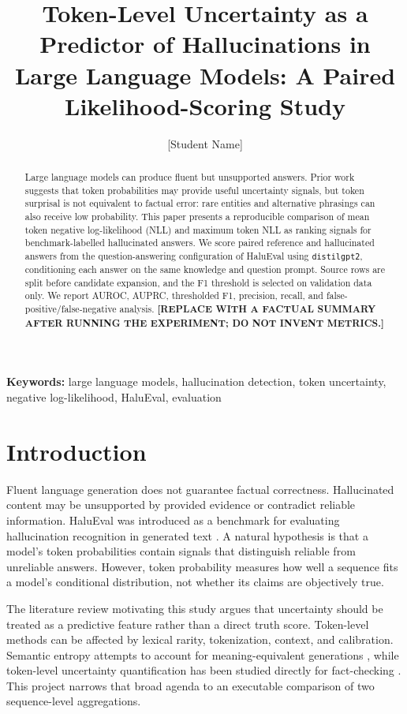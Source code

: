 \documentclass[10pt]{article}
\title{Token-Level Uncertainty as a Predictor of Hallucinations in Large Language Models: A Paired Likelihood-Scoring Study}
\author{[Student Name]\\[Department / Institution]}
\date{}
\begin{document}
\maketitle
\begin{abstract}
Large language models can produce fluent but unsupported answers. Prior work suggests that token probabilities may provide useful uncertainty signals, but token surprisal is not equivalent to factual error: rare entities and alternative phrasings can also receive low probability. This paper presents a reproducible comparison of mean token negative log-likelihood (NLL) and maximum token NLL as ranking signals for benchmark-labelled hallucinated answers. We score paired reference and hallucinated answers from the question-answering configuration of HaluEval using \texttt{distilgpt2}, conditioning each answer on the same knowledge and question prompt. Source rows are split before candidate expansion, and the F1 threshold is selected on validation data only. We report AUROC, AUPRC, thresholded F1, precision, recall, and false-positive/false-negative analysis. \textbf{[REPLACE WITH A FACTUAL SUMMARY AFTER RUNNING THE EXPERIMENT; DO NOT INVENT METRICS.]}
\end{abstract}
\noindent\textbf{Keywords:} large language models, hallucination detection, token uncertainty, negative log-likelihood, HaluEval, evaluation

\section{Introduction}
Fluent language generation does not guarantee factual correctness. Hallucinated content may be unsupported by provided evidence or contradict reliable information. HaluEval was introduced as a benchmark for evaluating hallucination recognition in generated text \cite{li2023halueval}. A natural hypothesis is that a model's token probabilities contain signals that distinguish reliable from unreliable answers. However, token probability measures how well a sequence fits a model's conditional distribution, not whether its claims are objectively true.

The literature review motivating this study argues that uncertainty should be treated as a predictive feature rather than a direct truth score. Token-level methods can be affected by lexical rarity, tokenization, context, and calibration. Semantic entropy attempts to account for meaning-equivalent generations \cite{kuhn2023semantic,farquhar2024semantic}, while token-level uncertainty quantification has been studied directly for fact-checking \cite{fadeeva2024factchecking}. This project narrows that broad agenda to an executable comparison of two sequence-level aggregations.
\end{document}
